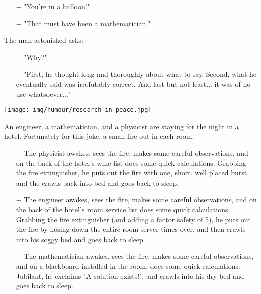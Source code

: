 \begin{itemize}	 
	\item[$-$]  "You're in a balloon!"

	\item[$-$] "That must have been a mathematician."
\end{itemize}

The man astonished asks:

\begin{itemize}	 
	\item[$-$] "Why?"

	\item[$-$]  "First, he thought long and thoroughly about what to say. Second, what he eventually said was irrefutably correct. And last but not least... it was of no use whatsoever..."
\end{itemize}
	
\begin{center}\underline{\hspace{5 cm}}\end{center}
	
	\begin{center}
		\texttt{[image: img/humour/research\_in\_peace.jpg]}	
	\end{center}
	
\begin{center}\underline{\hspace{5 cm}}\end{center}

An engineer, a mathematician, and a physicist are staying for the night in a hotel. Fortunately for this joke, a small fire out in each room.

\begin{itemize}	 
	\item[$-$] The physicist awakes, sees the fire, makes some careful observations, and on the back of the hotel's wine list does some quick calculations. Grabbing the fire extinguisher, he puts out the fire with one, short, well placed burst, and the crawls back into bed and goes back to sleep.

	\item[$-$] The engineer awakes, sees the fire, makes some careful observations, and on the back of the hotel's room service list does some quick calculations. Grabbing the fire extinguisher (and adding a factor safety of 5), he puts out the fire by hosing down the entire room server times over, and then crawls into his soggy bed and goes back to sleep.

	\item[$-$] The mathematician awakes, sees the fire, makes some careful observations, and on a blackboard installed in the room, does some quick calculations. Jubilant, he exclaims "A solution exists!", and crawls into his dry bed and goes back to sleep.
\end{itemize}
	
